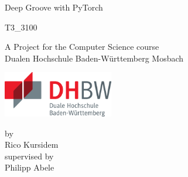 \def\doctype{T3\_3100}
\def\title{Deep Groove with PyTorch}
\def\author{Rico Kursidem}
\def\supervisor{Philipp Abele}

\begin{titlepage}

\vspace{10mm}

\begin{center}
	\vspace{5mm}
	\huge \title
	
	\vspace{34pt}
	\large \doctype
		
	\vspace{30pt}	
	\small  A Project for the Computer Science course\\
	\large Dualen Hochschule Baden-Württemberg Mosbach
    \vspace{35pt}
    
    \includegraphics[height=2cm]{prefix/image/logo-dhbw.eps}
	
	\vspace{40pt}	
	\small by \\
	\large \author \\
	\small supervised by \\
	\large \supervisor
\end{center}

\vspace{75pt}


\vspace{49.7pt}


\end{titlepage}